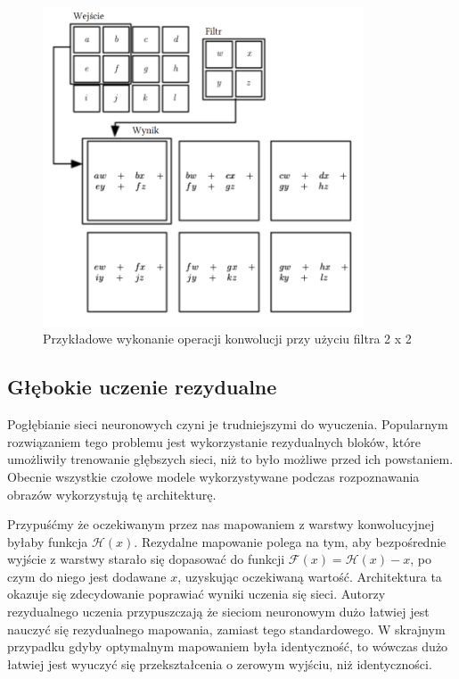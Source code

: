 \documentclass[licencjacka]{pracamgr}
\begin{document}
\begin{figure}[ht!]
  \centering
  \includegraphics[width=0.85\textwidth]{konwolucja}
  \caption{Przykładowe wykonanie operacji konwolucji przy użyciu filtra 2 x 2}
\end{figure}

\subsection{Głębokie uczenie rezydualne}

Pogłębianie sieci neuronowych czyni je trudniejszymi do wyuczenia. Popularnym rozwiązaniem tego problemu jest wykorzystanie rezydualnych bloków, które umożliwiły trenowanie głębszych sieci, niż to było możliwe przed ich powstaniem. Obecnie wszystkie czołowe modele wykorzystywane podczas rozpoznawania obrazów wykorzystują tę architekturę.

Przypuśćmy że oczekiwanym przez nas mapowaniem z warstwy konwolucyjnej byłaby funkcja $ \mathcal{H}(x) $. Rezydalne mapowanie polega na tym, aby bezpośrednie wyjście z warstwy starało się dopasować do funkcji $ \mathcal{F}(x) = \mathcal{H}(x) - x $, po czym do niego jest dodawane $x$, uzyskując oczekiwaną wartość. Architektura ta okazuje się zdecydowanie poprawiać wyniki uczenia się sieci. Autorzy rezydualnego uczenia przypuszczają że sieciom neuronowym dużo łatwiej jest nauczyć się rezydualnego mapowania, zamiast tego standardowego. W skrajnym przypadku gdyby optymalnym mapowaniem była identyczność, to wówczas dużo łatwiej jest wyuczyć się przekształcenia o zerowym wyjściu, niż identyczności.
\end{document}
